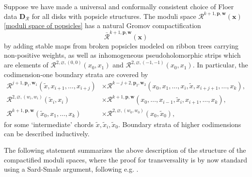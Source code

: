 \documentclass[11pt]{amsproc}
\def\cR{\mathcal{R}}
\theoremstyle{remark}
\numberwithin{equation}{section}
\begin{document}
Suppose we have made a universal and conformally consistent choice of Floer data $\mathbf{D}_{\cR}$ for all disks with popsicle structures.
The moduli space $\cR^{k+1, \mathbf{p}, \mathbf{w}}(\mathbf{x})$ \eqref{moduli space of popsicles} has a natural Gromov compactification 
\begin{equation}
\bar{\cR}^{k+1, \mathbf{p}, \mathbf{w}}(\mathbf{x})
\end{equation}
by adding stable maps from broken popsicles modeled on ribbon trees carrying non-positive weights,
as well as inhomogeneous pseudoholomorphic strips which are elements of $\cR^{2, \varnothing, (0, 0)}(x_{0}, x_{1})$ and $\cR^{2, \varnothing, (-1, -1)}(x_{0}, x_{1})$.
In particular, the codimension-one boundary strata are covered by
\begin{align}
\cR^{j+1, \mathbf{p}_{1}, \mathbf{w}_{1}}(\tilde{x}, x_{i+1}, \ldots, x_{i+j}) & \times \cR^{k-j+2, \mathbf{p}_{2}, \mathbf{w}_{2}}(x_{0}, x_{1}, \ldots, x_{i}, \tilde{x}, x_{i+j+1}, \ldots, x_{k}), \\
\cR^{2, \varnothing, (w_{i}, w_{i})}(\tilde{x}_{i}, x_{i}) & \times \cR^{k+1, \mathbf{p}, \mathbf{w}}(x_{0}, \ldots, x_{i-1}, \tilde{x}_{i}, x_{i+1}, \ldots, x_{k}), \\
 \cR^{k+1, \mathbf{p}, \mathbf{w}}(\tilde{x}_{0}, x_{1}, \ldots, x_{k}) & \times \cR^{2, \varnothing, (w_{0}, w_{0})}(x_{0}, \tilde{x}_{0}),
\end{align}
for some `intermediate' chords $\tilde{x}, \tilde{x}_{i}, \tilde{x}_{0}$.
Boundary strata of higher codimensions can be described inductively.

The following statement summarizes the above description of the structure of the compactified moduli spaces,
where the proof for transversality is by now standard using a Sard-Smale argument, following e.g. \cite{seidel_book}.
\end{document}
